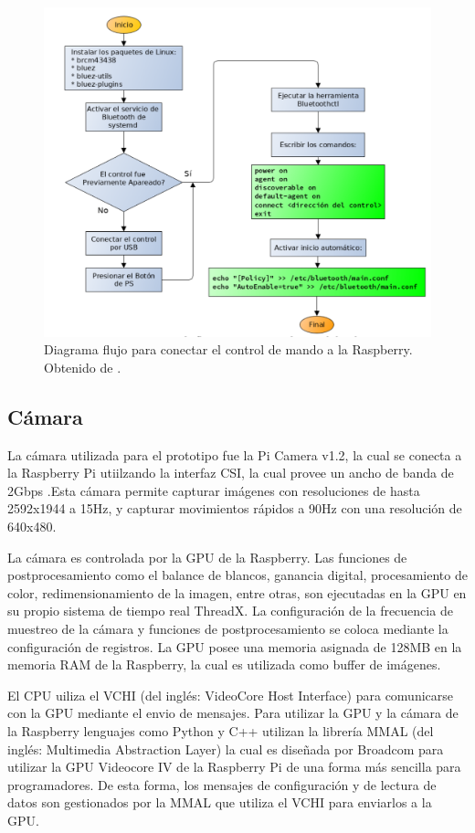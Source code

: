\begin{figure}[H]
	\centering	
	\includegraphics[width=0.7\linewidth]{imagenes/prototipo/DiagramaSaid}
	\caption{Diagrama flujo para conectar el control de mando a la Raspberry. Obtenido de \cite{said}.}
	\label{imagen:DiagramaSaid}
\end{figure}

\subsection{Cámara}

La cámara utilizada para el prototipo fue la Pi Camera v1.2, la cual se conecta a la Raspberry Pi utiilzando la interfaz CSI, la cual provee un ancho de banda de 2Gbps .Esta cámara permite capturar imágenes con resoluciones de hasta 2592x1944 a 15Hz, y capturar movimientos rápidos a 90Hz con una resolución de 640x480.

La cámara es controlada por la GPU de la Raspberry. Las funciones de postprocesamiento como el balance de blancos, ganancia digital, procesamiento de color, redimensionamiento de la imagen, entre otras, son ejecutadas en la GPU en su propio sistema de tiempo real ThreadX. La configuración de la frecuencia de muestreo de la cámara y funciones de postprocesamiento se coloca mediante la configuración de registros. La GPU posee una memoria asignada de 128MB en la memoria RAM de la Raspberry, la cual es utilizada como buffer de imágenes. 

El CPU uiliza el VCHI (del inglés: VideoCore Host Interface) para comunicarse con la GPU mediante el envio de mensajes. Para utilizar la GPU y la cámara de la Raspberry lenguajes como Python y C++ utilizan la librería MMAL (del inglés: Multimedia Abstraction Layer) la cual es diseñada por Broadcom para utilizar la GPU Videocore IV de la Raspberry Pi de una forma más sencilla para programadores. De esta forma, los mensajes de configuración y de lectura de datos son gestionados por la MMAL que utiliza el VCHI para enviarlos a la GPU.

